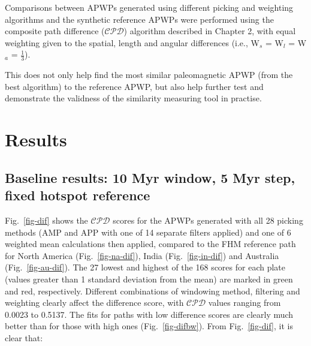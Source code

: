 Comparisons between APWPs generated using different picking and weighting
algorithms and the synthetic reference APWPs were performed using the composite
path difference ($\mathcal{CPD}$) algorithm described in Chapter 2, with equal
weighting given to the spatial, length and angular differences (i.e., W$_s$ =
W$_l$ = W$_a$ = $\frac{1}{3}$).

This does not only help find the most similar paleomagnetic APWP (from the best
algorithm) to the reference APWP, but also help further test and demonstrate the
validness of the similarity measuring tool in practise.

\section{Results}

\subsection{Baseline results: 10 Myr window, 5 Myr step, fixed hotspot
reference}

Fig.~\ref{fig-dif} shows the $\mathcal{CPD}$ scores for the APWPs generated with
all 28 picking methods (AMP and APP with one of 14 separate filters applied) and
one of 6 weighted mean calculations then applied, compared to the FHM reference
path for North America (Fig.~\ref{fig-na-dif}), India (Fig.~\ref{fig-in-dif})
and Australia (Fig.~\ref{fig-au-dif}). The 27 lowest and highest of the 168
scores for each plate (values greater than 1 standard deviation from the mean)
are marked in green and red, respectively. Different combinations of windowing
method, filtering and weighting clearly affect the difference score, with
$\mathcal{CPD}$ values ranging from 0.0023 to 0.5137. The fits for paths with
low difference scores are clearly much better than for those with high ones
(Fig.~\ref{fig-difbw}). From Fig.~\ref{fig-dif}, it is clear that:

